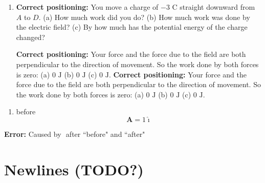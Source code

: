 \documentclass{article}
\newcommand{\ihat}[0]{\hat{\boldsymbol{\imath}}}
\begin{document}
\begin{enumerate}

  \item[5.] \textbf{Correct positioning:} You move a charge of $-3\text{ C}$ straight downward from $A$ to $D$. (a) How much work did you do? (b) How much work was done by the electric field? (c) By how much has the potential energy of the charge changed?

            \ifsolutions
            \textbf{Correct positioning:} Your force and the force due to the field are both perpendicular to the direction of movement. So the work done by both forces is zero: (a) $0\text{ J}$ (b) $0\text{ J}$ (c) $0 \text{ J}$.
            \else
            \textbf{Correct positioning:} Your force and the force due to the field are both perpendicular to the direction of movement. So the work done by both forces is zero: (a) $0\text{ J}$ (b) $0\text{ J}$ (c) $0 \text{ J}$.
            \fi

\end{enumerate}

\begin{enumerate}

  \item before
        \begin{equation}
        \mathbf{A}=1\ihat
        \end{equation}

\end{enumerate}

\textbf{Error:} Caused by \texttt{$$} after ``before" and ``after"

\begin{enumerate}

  \item before \texttt{\begin{equation}
        \end{equation}
        =1\ihat
        \begin{equation}
        after

  \item before \texttt{\begin{equation}
        \end{equation}
        =1\ihat
        \begin{equation}
        after

\end{enumerate}

\section{Newlines (TODO?)}
\end{document}
